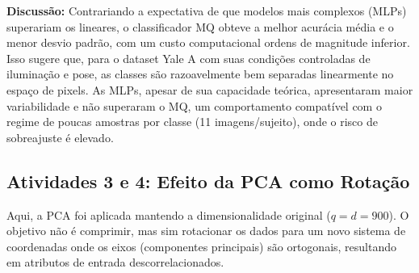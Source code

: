 \documentclass[a4paper,12pt]{article}
\begin{document}
\begin{table}[h!]
\centering
\caption{Resultados médios das Atividades 1-2 (sem PCA, escala \(30\times 30\)).}
\label{tab:tabela1}
\end{table}

\noindent\textbf{Discussão:} Contrariando a expectativa de que modelos mais complexos (MLPs) superariam os lineares, o classificador MQ obteve a melhor acurácia média e o menor desvio padrão, com um custo computacional ordens de magnitude inferior. Isso sugere que, para o dataset Yale A com suas condições controladas de iluminação e pose, as classes são razoavelmente bem separadas linearmente no espaço de pixels. As MLPs, apesar de sua capacidade teórica, apresentaram maior variabilidade e não superaram o MQ, um comportamento compatível com o regime de poucas amostras por classe (11 imagens/sujeito), onde o risco de sobreajuste é elevado.

\subsection{Atividades 3 e 4: Efeito da PCA como Rotação}
Aqui, a PCA foi aplicada mantendo a dimensionalidade original (\(q=d=900\)). O objetivo não é comprimir, mas sim rotacionar os dados para um novo sistema de coordenadas onde os eixos (componentes principais) são ortogonais, resultando em atributos de entrada descorrelacionados.

\begin{table}[h!]
\centering
\caption{Resultados com a aplicação de PCA (sem redução de dimensionalidade).}
\label{tab:tabela2}
\end{table}
\end{document}

